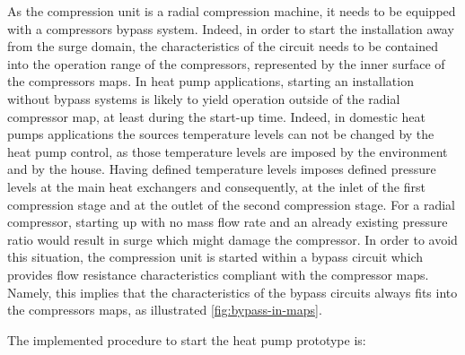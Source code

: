 As the compression unit is a radial compression machine, it needs to
be equipped with a compressors bypass system. Indeed, in order to
start the installation away from the surge domain, the characteristics of the circuit needs to
be contained into the operation range of the compressors, represented by
the inner surface of the compressors maps. In heat pump applications,
starting an installation without bypass systems is likely to yield
operation outside of the radial compressor map, at least during the
start-up time. Indeed, in domestic heat pumps applications the sources
temperature levels can not be changed by the heat pump control, as
those temperature levels are imposed by the environment and by the
house. Having defined temperature levels imposes defined pressure
levels at the main heat exchangers and consequently, at the inlet of
the first compression stage and at the outlet of the second
compression stage. For a radial compressor, starting up with no mass
flow rate and an already existing pressure ratio would result in surge
which might damage the compressor. In order to avoid this situation,
the compression unit is started within a bypass circuit which provides
flow resistance characteristics compliant with the compressor
maps. Namely, this implies that the characteristics of the bypass
circuits always fits into the compressors maps, as illustrated
\cref{fig:bypass-in-maps}.

The implemented procedure to start the heat pump prototype is:

